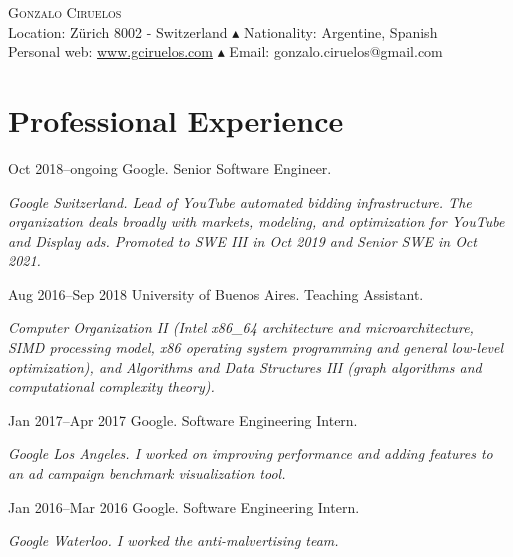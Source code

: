 \documentclass[a4paper,english,10pt]{article}
\begin{document}
\pagestyle{empty}

\begin{center}

  \Large{\textsc{Gonzalo Ciruelos}}\\
  \vspace{0.3em}
\footnotesize{
  Location: Z\"urich 8002 - Switzerland $\blacktriangle$ Nationality: Argentine, Spanish \\
  Personal web: \href{http://www.gciruelos.com}{www.gciruelos.com} $\blacktriangle$ Email: gonzalo.ciruelos@gmail.com
}
\end{center}


\section{Professional Experience}
\begin{CV}
\item[Oct 2018--ongoing] Google. Senior Software Engineer.\newline
  \begin{footnotesize}
  \emph{Google Switzerland. Lead of YouTube automated bidding infrastructure. The organization deals broadly with markets, modeling, and optimization for YouTube and Display ads. Promoted to SWE III in Oct 2019 and Senior SWE in Oct 2021.}
  \end{footnotesize}
\item[Aug 2016--Sep 2018] University of Buenos Aires. Teaching Assistant.\newline
  \begin{footnotesize}
  \emph{Computer Organization II (Intel x86\_64 architecture and microarchitecture, SIMD processing model, x86 operating system programming and general low-level optimization), and Algorithms and Data Structures III (graph algorithms and computational complexity theory).}
  \end{footnotesize}
\item[Jan 2017--Apr 2017] Google. Software Engineering Intern.\newline
  \begin{footnotesize}
  \emph{Google Los Angeles. I worked on improving performance and adding features to an ad campaign benchmark visualization tool.}
  \end{footnotesize}
\item[Jan 2016--Mar 2016] Google. Software Engineering Intern.\newline
  \begin{footnotesize}
  \emph{Google Waterloo. I worked the anti-malvertising team.}
  \end{footnotesize}
\end{CV}
\end{document}
